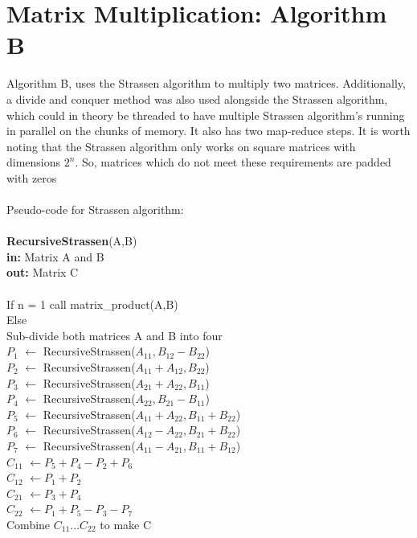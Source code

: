 \documentclass[10pt,a4paper]{article}
\begin{document}
\section{Matrix Multiplication: Algorithm B}
\noindent Algorithm B, uses the Strassen algorithm to multiply two matrices. Additionally, a divide and conquer method was also used alongside the Strassen algorithm, which could in theory be threaded to have multiple Strassen algorithm's running in parallel on the chunks of memory. It also has two map-reduce steps.
It is worth noting that the Strassen algorithm only works on square matrices with dimensions $2^n$. So, matrices which do not meet these requirements are padded with zeros\\\\
Pseudo-code for Strassen algorithm:\\\\
\textbf{RecursiveStrassen}(A,B)\\
\textbf{in:} Matrix A and B\\
\textbf{out:} Matrix C\\\\
If n = 1 call matrix\_product(A,B)\\
Else\\
	\indent Sub-divide both matrices A and B into four\\
	\indent$P_{1}$ $\leftarrow$ RecursiveStrassen($A_{11}, B_{12} - B_{22}$)\\
	\indent$P_{2}$ $\leftarrow$ RecursiveStrassen($A_{11}+A_{12}, B_{22}$)\\
	\indent$P_{3}$ $\leftarrow$ RecursiveStrassen($A_{21}+A_{22}, B_{11} $)\\
	\indent$P_{4}$ $\leftarrow$ RecursiveStrassen($A_{22}, B_{21} - B_{11}$)\\
	\indent$P_{5}$ $\leftarrow$ RecursiveStrassen($A_{11}+A_{22}, B_{11} + B_{22}$)\\
	\indent$P_{6}$ $\leftarrow$ RecursiveStrassen($A_{12}-A_{22}, B_{21} + B_{22}$)\\
	\indent$P_{7}$ $\leftarrow$ RecursiveStrassen($A_{11}-A_{21}, B_{11} + B_{12}$)\\
	\indent$C_{11}$ $\leftarrow$$P_{5} +P_{4} - P_{2}+ P_{6}$\\
	\indent$C_{12}$ $\leftarrow$$P_{1} +P_{2}$\\
	\indent$C_{21}$ $\leftarrow$$P_{3} +P_{4}$\\
	\indent$C_{22}$ $\leftarrow$$P_{1} +P_{5} - P_{3}- P_{7}$\\
	\indent Combine $C_{11}...C_{22}$ to make C\\
\end{document}
